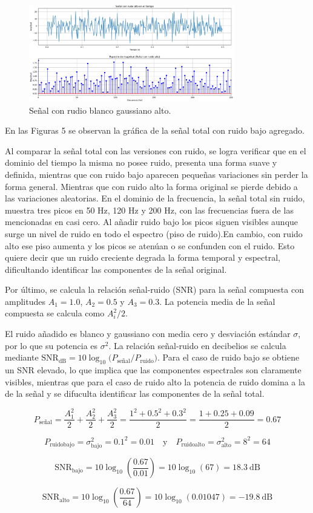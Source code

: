 \bigskip
\begin{figure}[H]
\centering
\includegraphics[width=0.8\textwidth]{parte_teorica/senalconruidoalto.png}
\caption{Señal con rudio blanco gaussiano alto.}
\end{figure}
\bigskip


En las Figuras 5 se observan la gráfica de la señal total con ruido bajo agregado.
\bigskip

 Al comparar la señal total con las versiones con ruido, se logra verificar que en el dominio del tiempo la misma no posee ruido, presenta una forma suave y definida, mientras que con ruido bajo aparecen pequeñas variaciones sin perder la forma general. Mientras que con ruido alto la forma original se pierde debido a las variaciones aleatorias. En el dominio de la frecuencia, la señal total sin ruido, muestra tres picos en 50 Hz, 120 Hz y 200 Hz, con las frecuencias fuera de las mencionadas en casi cero. Al añadir ruido bajo los picos siguen visibles aunque surge un nivel de ruido en todo el espectro (piso de ruido).En cambio, con ruido alto ese piso aumenta y los picos se atenúan o se confunden con el ruido. Esto quiere decir que un ruido creciente degrada la forma temporal y espectral, dificultando identificar las componentes de la señal original.

\bigskip

Por último, se calcula la relación señal-ruido (SNR) para la señal compuesta con amplitudes $A_1=1.0$, $A_2=0.5$ y $A_3=0.3$. 
La potencia media de la señal compuesta se calcula como $A_i^2/2$.

El ruido añadido es blanco y gaussiano con media cero y desviación estándar $\sigma$, por lo que su potencia es $\sigma^2$. 
La relación señal-ruido en decibelios se calcula mediante 
$\text{SNR}_{\mathrm{dB}}=10\log_{10}\!\bigl(P_{\text{señal}}/P_{\text{ruido}}\bigr)$. 
Para el caso de ruido bajo se obtiene un SNR elevado, lo que implica que las componentes espectrales son claramente visibles, 
mientras que para el caso de ruido alto la potencia de ruido domina a la de la señal y se difuculta identificar las componentes de la señal total.
\bigskip

\noindent \[
P_{\text{señal}} = 
\frac{A_1^2}{2}+\frac{A_2^2}{2}+\frac{A_3^2}{2}=
\frac{1^2+0.5^2+0.3^2}{2}=
\frac{1+0.25+0.09}{2}=0.67
\]

\noindent \[
P_{\text{ruidobajo}}=\sigma_{\text{bajo}}^2=0.1^2=0.01
\quad\text{y}\quad
P_{\text{ruidoalto}}=\sigma_{\text{alto}}^2=8^2=64
\]

\noindent \[
\text{SNR}_{\text{bajo}}=
10\log_{10}\!\left(\frac{0.67}{0.01}\right)=10\log_{10}(67)=18.3~\text{dB}
\]

\noindent \[
\text{SNR}_{\text{alto}}=
10\log_{10}\!\left(\frac{0.67}{64}\right)=10\log_{10}(0.01047)=-19.8~\text{dB}
\]
